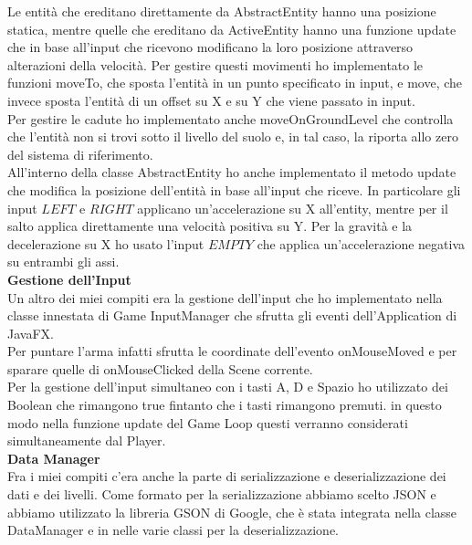\documentclass{article}
\begin{document}
Le entità che ereditano direttamente da AbstractEntity hanno una posizione statica, mentre quelle che ereditano da ActiveEntity hanno una funzione update che in base all'input che ricevono modificano la loro posizione attraverso alterazioni della velocità. Per gestire questi movimenti ho implementato le funzioni moveTo, che sposta l'entità in un punto specificato in input, e move, che invece sposta l'entità di un offset su X e su Y che viene passato in input.\\
Per gestire le cadute ho implementato anche moveOnGroundLevel che controlla che l'entità non si trovi sotto il livello del suolo e, in tal caso, la riporta allo zero del sistema di riferimento.\\

All'interno della classe AbstractEntity ho anche implementato il metodo update che modifica la posizione dell'entità in base all'input che riceve.
In particolare gli input {$LEFT$} e {$RIGHT$} applicano un'accelerazione su X all'entity, mentre per il salto applica direttamente una velocità positiva su Y. Per la gravità e la decelerazione su X ho usato l'input {$EMPTY$} che applica un'accelerazione negativa su entrambi gli assi.\\

\textbf{Gestione dell'Input}\\

Un altro dei miei compiti era la gestione dell'input che ho implementato nella classe innestata di Game InputManager che sfrutta gli eventi dell'Application di JavaFX.\\

Per puntare l'arma infatti sfrutta le coordinate dell'evento onMouseMoved e per sparare quelle di onMouseClicked della Scene corrente.\\
Per la gestione dell'input simultaneo con i tasti A, D e Spazio ho utilizzato dei Boolean che rimangono true fintanto che i tasti rimangono premuti. in questo modo nella funzione update del Game Loop questi verranno considerati simultaneamente dal Player.\\

\textbf{Data Manager}\\

Fra i miei compiti c'era anche la parte di serializzazione e deserializzazione dei dati e dei livelli. Come formato per la serializzazione abbiamo scelto JSON e abbiamo utilizzato la libreria GSON di Google, che è stata integrata nella classe DataManager e in nelle varie classi per la deserializzazione.
\end{document}
